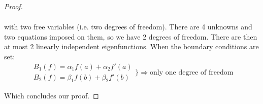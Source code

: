 \begin{proof}
\begin{enumerate}
\begin{align*}
\end{align*}
with two free variables (i.e. two degrees of freedom). There
are 4 unknowns and two equations imposed on them, so we have
2 degrees of freedom. There are then at most 2 linearly
independent eigenfunctions. When the boundary conditions are
set:
\begin{equation}
\begin{array}{l}
B_{1}(f) = \alpha_{1}f(a) + \alpha_{2}f'(a)\\
B_{2}(f) = \beta_{1}f(b) + \beta_{2}f'(b)
\end{array}\bigg\}\Rightarrow \text{only one degree of freedom}
\end{equation}
\end{enumerate}
Which concludes our proof.
\end{proof}

